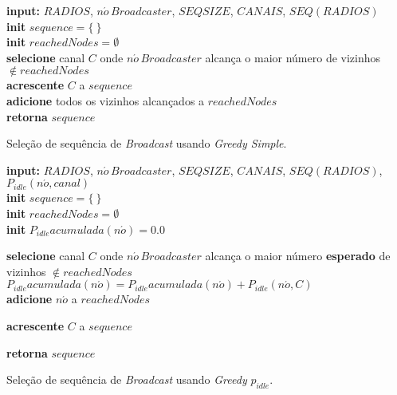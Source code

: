 \begin{algorithm}[t]
	\SetVline
	{\bf input:} $RADIOS$, $n\acute{o} \, Broadcaster$, $SEQSIZE$, $CANAIS$, $SEQ(RADIOS)$\\

	{\bf init} $sequence = \{ \:\}$\\
	{\bf init} $reachedNodes = \emptyset$\\
	 {
		{\bf selecione} canal $C$ onde $n\acute{o} \, Broadcaster$ alcança o maior número de vizinhos $\notin reachedNodes$\\
		{\bf acrescente} $C$ a $sequence$\\
		{\bf adicione} todos os vizinhos alcançados a $reachedNodes$\\
	}
	{\bf retorna} $sequence$	
	\caption{Seleção de sequência de \textit{Broadcast} usando \textit{Greedy Simple}.}
	\label{alg:simple}
\end{algorithm}

\begin{algorithm}[t]
	\SetVline
	{\bf input:} $RADIOS$, $n\acute{o} \, Broadcaster$, $SEQSIZE$, $CANAIS$, $SEQ(RADIOS)$, $P_{idle}(n\acute{o}, canal)$\\

	{\bf init} $sequence = \{ \:\}$\\
	{\bf init} $reachedNodes = \emptyset$\\
	 {
		{\bf init} $P_{idle}acumulada(n\acute{o}) = 0.0$\\
	}
	 {
		{\bf selecione} canal $C$ onde $n\acute{o} \, Broadcaster$ alcança o maior número {\bf esperado} de vizinhos $\notin reachedNodes$\\
		 {
			$P_{idle}acumulada(n\acute{o}) = P_{idle}acumulada(n\acute{o}) + P_{idle}(n\acute{o}, C)$\\
			 {
				{\bf adicione} $n\acute{o}$ a $reachedNodes$\\
			}
		}

		{\bf acrescente} $C$ a $sequence$\\

	}
	{\bf retorna} $sequence$	
	\caption{Seleção de sequência de \textit{Broadcast} usando \textit{Greedy} $p_{idle}$.}
	\label{alg:pidle}
\end{algorithm}

